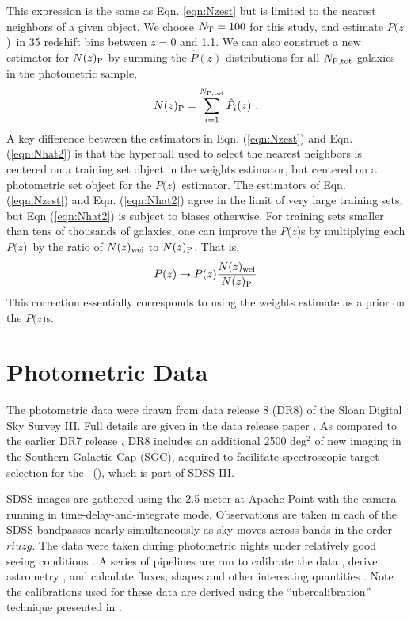 \documentclass[12pt,preprint]{aastex}
\newcommand{\pofz}{$P(z$)}
\newcommand{\nwei}{N(z)_{\rm wei}}
\newcommand{\npz}{N(z)_{\rm P}}
\begin{document}
\noindent This expression is the same as Eqn. \ref{eqn:Nzest} but is limited to
the nearest neighbors of a given object.  We choose $N_{\rm T}=100$ for this
study, and estimate \pofz\ in 35 redshift bins between $z=0$ and 1.1.  We can
also construct a new estimator for $N(z)_{\rm P}$ by summing the $\hat{P}(z)$
distributions for all $N_{\rm P,tot}$ galaxies in the photometric
sample,
\begin{equation}
\npz = \sum_{i=1}^{N_{\rm P,tot}}\hat{P}_i(z)~.
\label{eqn:Nhat2}
\end{equation}
\noindent A key difference between the estimators in Eqn. (\ref{eqn:Nzest})
and Eqn. (\ref{eqn:Nhat2}) is that the hyperball used to select the nearest
neighbors is centered on a training set object in the weights estimator, but
centered on a photometric set object for the \pofz\ estimator.  The estimators
of Eqn. (\ref{eqn:Nzest}) and  Eqn. (\ref{eqn:Nhat2}) agree in the limit of
very large training sets, but Eqn (\ref{eqn:Nhat2}) is subject to biases
otherwise.  For training sets smaller than tens of thousands of galaxies, one
can improve the \pofz s by multiplying each \pofz\ by the ratio of $\nwei$ to
$\npz$.  That is,
\begin{equation} \label{eq:pzcorrect}
P(z) \rightarrow P(z)\frac{\nwei}{\npz} \label{eqn:pzcorrect}
\end{equation}
This correction essentially corresponds to using the weights estimate as a
prior on the \pofz s.



\section{Photometric Data} \label{sec:data}

The photometric data were drawn from data release 8 (DR8) of the Sloan Digital
Sky Survey III.  Full details are given in the data release paper \citet{dr8}.
As compared to the earlier DR7 release \citep{dr7}, DR8 includes an additional
2500 deg$^2$ of new imaging in the Southern Galactic Cap (SGC), acquired to
facilitate spectroscopic target selection for the \bossfull\ (\boss), which is
part of SDSS III.


SDSS \citep{York00} images are gathered using the 2.5 meter at Apache Point
\citep{Gunn06} with the camera \citep{Gunn98} running in
time-delay-and-integrate mode.  Observations are taken in each of the SDSS
bandpasses \citep[{\it ugriz};][]{Fukugita96} nearly simultaneously as sky
moves across bands in the order $riuzg$.  The data were taken during
photometric nights under relatively good seeing conditions \citep{Hogg01}.  A
series of pipelines are run to calibrate the data
\citep{Nikhil08,Smith02,Tucker06}, derive astrometry \citep{Pier03}, and
calculate fluxes, shapes and other interesting quantities
\citep{LuptonADASS01}.  Note the calibrations used for these data are derived
using the ``ubercalibration'' technique presented in \citet{Nikhil08}.
\end{document}
